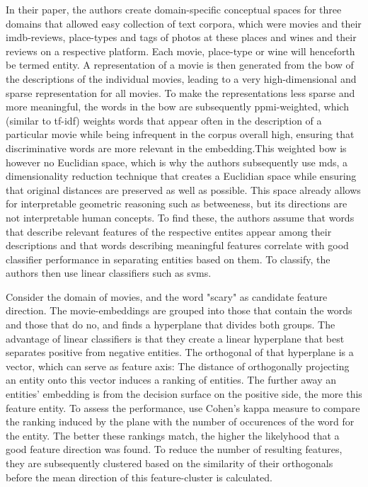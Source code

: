 In their paper, the authors create domain-specific conceptual spaces for three domains that allowed easy collection of text corpora, which were movies and their \gls{imdb}-reviews, place-types and tags of photos at these places and wines and their reviews on a respective platform. Each movie, place-type or wine will henceforth be termed \gls{entity}. A representation of a movie is then generated from the \gls{bow} of the descriptions of the individual movies, leading to a very high-dimensional and sparse representation for all movies. To make the representations less sparse and more meaningful, the words in the \gls{bow} are subsequently \gls{ppmi}-weighted, which (similar to \gls{tf-idf}) weights words that appear often in the description of a particular movie while being infrequent in the corpus overall high, ensuring that discriminative words are more relevant in the embedding.This weighted \gls{bow} is however no Euclidian space, which is why the authors subsequently use \gls{mds}, a dimensionality reduction technique that creates a Euclidian space while ensuring that original distances are preserved as well as possible. This space already allows for interpretable geometric reasoning such as betweeness, but its directions are not interpretable human concepts. To find these, the authors assume that words that describe relevant features of the respective entites appear among their descriptions and that words describing meaningful features correlate with good classifier performance in separating entities based on them. To classify, the authors then use linear classifiers such as \glspl{svm}. 

Consider the domain of movies, and the word "scary" as candidate feature direction. The movie-embeddings are grouped into those that contain the words and those that do no, and finds a hyperplane that divides both groups. The advantage of linear classifiers is that they create a linear hyperplane that best separates positive from negative entities. The orthogonal of that hyperplane is a vector, which can serve as feature axis: The distance of orthogonally projecting an entity onto this vector induces a ranking of entities. The further away an entities' embedding is from the decision surface on the positive side, the more this feature entity. To assess the performance, \cite{Derrac2015} use Cohen's kappa measure to compare the ranking induced by the plane with the number of occurences of the word for the entity. The better these rankings match, the higher the likelyhood that a good feature direction was found. To reduce the number of resulting features, they are subsequently clustered based on the similarity of their orthogonals before the mean direction of this feature-cluster is calculated. 

